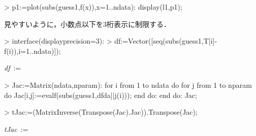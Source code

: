 \begin{MapleInput}
> p1:=plot(subs(guess1,f(x)),x=1..ndata): 
  display(l1,p1);  
\end{MapleInput}
見やすいように，小数点以下を3桁表示に制限する．
\begin{MapleInput}
> interface(displayprecision=3):
> df:=Vector([seq(subs(guess1,T[i]-f(i)),i=1..ndata)]);
\end{MapleInput}
\begin{MapleOutput}
{\it df}\, := \, \left[ \begin {array}{c}  0.396\\  0.897\\  2.538\\  3.600\\ - 1.400\\ - 0.462\\ - 0.103\\ - 0.016\end {array} \right]
\end{MapleOutput}

\begin{MapleInput}
> Jac:=Matrix(ndata,nparam): 
  for i from 1 to ndata do 
    for j from 1 to nparam do
      Jac[i,j]:=evalf(subs(guess1,dfda||j(i))); 
    end do: 
  end do:
  Jac;
\end{MapleInput}
\begin{MapleOutput}
\end{MapleOutput}

\begin{MapleInput}
> tJac:=(MatrixInverse(Transpose(Jac).Jac)).Transpose(Jac);
\end{MapleInput}
\begin{MapleOutput}
{\it tJac}\, := \,  
\end{MapleOutput}


